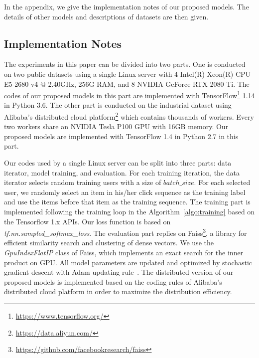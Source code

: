 
In the appendix, we give the implementation notes of our proposed models. The details of other models and descriptions of datasets are then given.

\subsection{Implementation Notes}

The experiments in this paper can be divided into two parts. One is conducted on two public datasets using a single Linux server with 4 Intel(R) Xeon(R) CPU E5-2680 v4 @ 2.40GHz, 256G RAM, and 8 NVIDIA GeForce RTX 2080 Ti. The codes of our proposed models in this part are implemented with TensorFlow\footnote{\label{fn:tf}\url{https://www.tensorflow.org/}} 1.14 in Python 3.6. 
The other part is conducted on the industrial dataset using Alibaba's distributed cloud platform\footnote{\url{https://data.aliyun.com/}} which contains thousands of workers. Every two workers share an NVIDIA Tesla P100 GPU with 16GB memory. Our proposed models are implemented with TensorFlow 1.4 in Python 2.7 in this part.

Our codes used by a single Linux server can be split into three parts: data iterator, model training, and evaluation. For each training iteration, the data iterator selects random training users with a size of $batch\_size$. For each selected user, we randomly select an item in his/her click sequence as the training label and use the items before that item as the training sequence. 
The training part is implemented following the training loop in the Algorithm~\ref{algo:training} based on the Tensorflow 1.x APIs. Our loss function is based on \textit{tf.nn.sampled\_softmax\_loss}.
The evaluation part replies on Faiss\footnote{\url{https://github.com/facebookresearch/faiss}}, a library for efficient similarity search and clustering of dense vectors. We use the \textit{GpuIndexFlatIP} class of Faiss, which implements an exact search for the inner product on GPU. 
All model parameters are updated and optimized by stochastic gradient descent with Adam updating rule~\cite{kingma2014adam}. 
The distributed version of our proposed models is implemented based on the coding rules of Alibaba's distributed cloud platform in order to maximize the distribution efficiency. 


